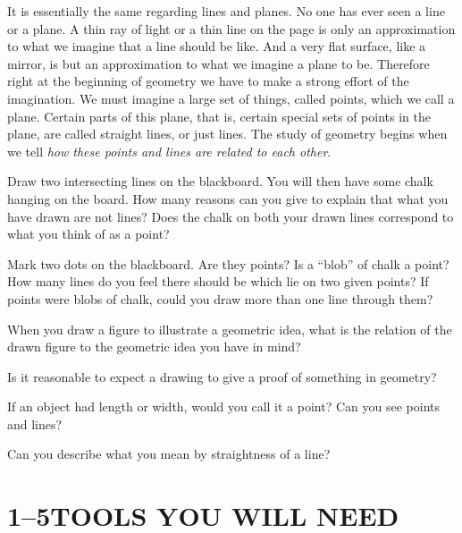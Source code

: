 \documentclass[11pt]{book}
\begin{document}
It is essentially the same regarding lines and planes. No one has ever seen a
line or a plane. A thin ray of light or a thin line on the page is only an
approximation to what we imagine that a line should be like. And a very flat
surface, like a mirror, is but an approximation to what we imagine a plane to be.
Therefore right at the beginning of geometry we have to make a strong effort of
the imagination. We must imagine a large set of things, called points, which we
call a plane. Certain parts of this plane, that is, certain special sets of
points in the plane, are called straight lines, or just lines. The study of
geometry begins when we tell \emph{how these points and lines are related to each
other}.

\begin{exercisecols}
\begin{exlist}
\item Draw two intersecting lines on the blackboard. You will then have some
      chalk hanging on the board. How many reasons can you give to explain that
      what you have drawn are not lines? Does the chalk on both your drawn lines
      correspond to what you think of as a point?
\item Mark two dots on the blackboard. Are they points? Is a ``blob'' of chalk a
      point? How many lines do you feel there should be which lie on two given
      points? If points were blobs of chalk, could you draw more than one line
      through them?
\item When you draw a figure to illustrate a geometric idea, what is the relation
      of the drawn figure to the geometric idea you have in mind?
\item Is it reasonable to expect a drawing to give a proof of something in
      geometry?
\item If an object had length or width, would you call it a point? Can you see
      points and lines?
\item Can you describe what you mean by straightness of a line?
\end{exlist}
\end{exercisecols}

\section*{1--5\quad TOOLS YOU WILL NEED}
\end{document}
